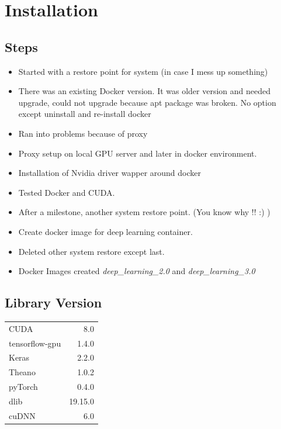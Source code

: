 \documentclass[a4paper]{article}
\begin{document}
\section{Installation}
\subsection{Steps}
\begin{itemize}
	\item {Started with a restore point for system (in case I mess up something)}
	\item {There was an existing Docker version. It was older version and needed upgrade, could not upgrade because apt package was broken. No option except uninstall and re-install docker}
	\item {Ran into problems because of proxy}
	\item {Proxy setup on local GPU server and later in docker environment.}
	\item {Installation of Nvidia driver wapper around docker}
	\item {Tested Docker and CUDA. }
	\item {After a milestone, another system restore point. (You know why !! :) )}
	\item {Create docker image for deep learning container.}
	\item {Deleted other system restore except last.}
	\item {Docker Images created \textit{deep\_learning\_2.0} and \textit{deep\_learning\_3.0}}
\end{itemize}


\subsection{Library Version}
\begin{center}
	\begin{tabular}{ l r }
		CUDA & 8.0 \\
		tensorflow-gpu & 1.4.0 \\
		Keras & 2.2.0 \\
		Theano & 1.0.2 \\
		pyTorch & 0.4.0 \\
		dlib & 19.15.0 \\
		cuDNN & 6.0 
	\end{tabular}
\end{center}
\end{document}

